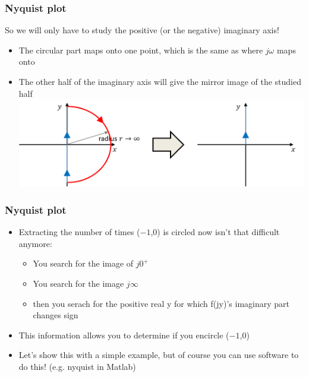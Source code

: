 \begin{frame}
\frametitle{Nyquist plot}
So we will only have to study the positive (or the negative) imaginary axis!
\\ \begin{itemize}
\item The circular part maps onto one point, which is the same as where $j\omega$ maps onto
\item The other half of the imaginary axis will give the mirror image of the studied half
\\ \includegraphics[width=0.9\linewidth]{Afbeelding12}
\end{itemize}
\end{frame}

\begin{frame}
\frametitle{Nyquist plot}
\begin{itemize}
\item Extracting the number of times ($-1$,$0$) is circled now isn't that difficult anymore:
\\ \begin{itemize}
\item You search for the image of $j0^+$
\item You search for the image $j\infty$
\item then you serach for the positive real y for which f(jy)'s imaginary part changes sign
\end{itemize}
\item This information allows you to determine if you encircle ($-1$,$0$)
\item Let’s show this with a simple example, but of course you can use software to do this! (e.g. nyquist in Matlab)
\end{itemize}
\end{frame}

